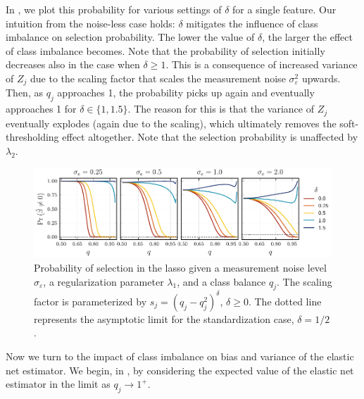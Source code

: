 In , we plot this probability for various settings of
\(\delta\) for a single feature. Our intuition from the noise-less case holds: \(\delta\)
mitigates the influence of class imbalance on selection probability. The lower the value of
\(\delta\), the larger the effect of class imbalance becomes. Note that the probability of
selection initially decreases also in the case when \(\delta \geq 1\). This is a
consequence of increased variance of \({Z_j}\) due to the scaling factor that scales the
measurement noise \(\sigma_\varepsilon^2\) upwards. Then, as \(q_j\) approaches 1, the
probability picks up again and eventually approaches 1 for \(\delta \in \{1, 1.5\}\). The
reason for this is that the variance of \({Z_j}\) eventually explodes (again due to the
scaling), which ultimately removes the soft-thresholding effect altogether. Note that the
selection probability is unaffected by \(\lambda_2\).

\begin{figure}[htpb]
  \centering
  \includegraphics[]{plots/selection_probability.pdf}
  \caption{%
    Probability of selection in the lasso given a measurement noise level \(\sigma_\varepsilon\), a regularization parameter \(\lambda_1\), and a class balance \(q_j\). The scaling factor is parameterized by \(s_j = (q_j - q_j^2)^\delta\), \(\delta \geq 0\). The dotted line represents the asymptotic limit for the standardization case, \(\delta = 1/2\).}
  \label{fig:selection-probability}
\end{figure}

Now we turn to the impact of class imbalance on bias and variance of the elastic net
estimator. We begin, in , by considering the expected value of
the elastic net estimator in the limit as \(q_j \rightarrow 1^+\).

